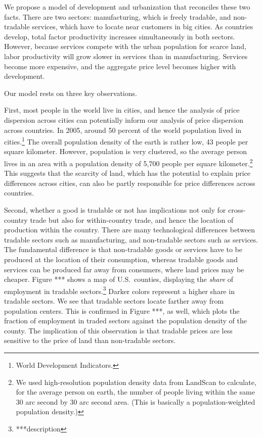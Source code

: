 \documentclass[12pt]{article}
\begin{document}
We propose a model of development and urbanization that reconciles these two facts. There are two sectors: manufacturing, which is freely tradable, and non-tradable services, which have to locate near customers in big cities. As countries develop, total factor productivity increases simultaneously in both sectors. However, because services compete with the urban population for scarce land, labor productivity will grow slower in services than in manufacturing. Services become more expensive, and the aggregate price level becomes higher with development.

Our model rests on three key observations.

First, most people in the world live in cities, and hence the analysis of price dispersion across cities can potentially inform our analysis of price dispersion across countries. In 2005, around 50 percent of the world population lived in cities.\footnote{World Development Indicators.} The overall population density of the earth is rather low, 43 people per square kilometer.  However, population is very clustered, so the average person lives in an area with a population density of 5,700 people per square kilometer.\footnote{We used high-resolution population density data from LandScan to calculate, for the average person on earth, the number of people living within the same 30 arc second by 30 arc second area. (This is basically a population-weighted population density.) } This suggests that the scarcity of land, which has the potential to explain price differences across cities, can also be partly responsible for price differences across countries.

Second, whether a good is tradable or not has implications not only for cross-country trade but also for within-country trade, and hence the location of production within the country. There are many technological differences between tradable sectors such as manufacturing, and non-tradable sectors such as services. The fundamental difference is that non-tradable goods or services have to be produced at the location of their consumption, whereas tradable goods and services can be produced far away from consumers, where land prices may be cheaper. Figure *** shows a map of U.S.~counties, displaying the \emph{share} of employment in tradable sectors.\footnote{***description} Darker colors represent a higher share in tradable sectors. We see that tradable sectors locate farther away from population centers. This is confirmed in Figure ***, as well, which plots the fraction of employment in traded sectors against the population density of the county. The implication of this observation is that tradable prices are less sensitive to the price of land than non-tradable sectors.
\end{document}
